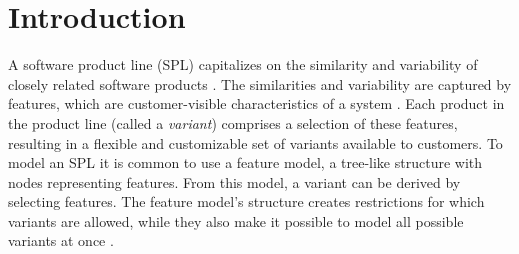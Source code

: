 



\chapter{Introduction}

A software product line (SPL) capitalizes on the similarity and variability of closely related software products \cite{book:introduction-to-spl}. The similarities and variability are captured by features, which are customer-visible characteristics of a system \cite{book:introduction-to-spl}. Each product in the product line (called a \textit{variant}) comprises a selection of these features, resulting in a flexible and customizable set of variants available to customers. To model an SPL it is common to use a feature model, a tree-like structure with nodes representing features. From this model, a variant can be derived by selecting features. The feature model's structure creates restrictions for which variants are allowed, while they also make it possible to model all possible variants at once \cite{art:feature-models-grammars-and-propositional-formulas}.

